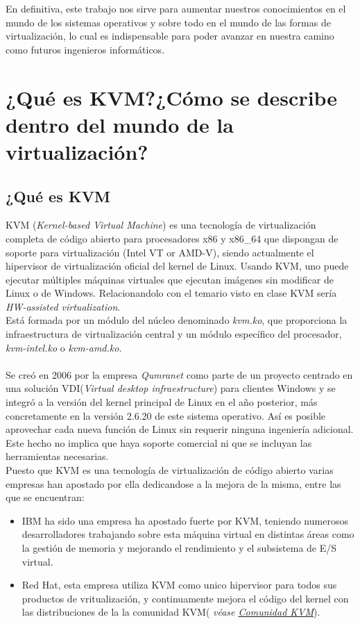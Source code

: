 \documentclass[11pt]{article}
\begin{document}
En definitiva, este trabajo nos sirve para aumentar nuestros conocimientos en el mundo de los sistemas operativos y sobre todo en el mundo de las formas de virtualización, lo cual es indispensable para poder avanzar en nuestra camino como futuros ingenieros informáticos.

\section{¿Qué es KVM?¿Cómo se describe dentro del mundo de la virtualización?}
\subsection{¿Qué es KVM}
KVM (\textit{Kernel-based Virtual Machine}) es una tecnología de virtualización completa de código abierto para procesadores x86 y x86\_64 que dispongan de soporte para virtualización (Intel VT or AMD-V), siendo actualmente el hipervisor de virtualización oficial del kernel de Linux. Usando KVM, uno puede ejecutar múltiples máquinas virtuales que ejecutan imágenes sin modificar de Linux o de Windows. Relacionandolo con el temario visto en clase KVM sería \textit{HW-assisted virtualization}.\\

Está formada por un módulo del núcleo denominado \textit{kvm.ko}, que proporciona la infraestructura de virtualización central y un módulo específico del procesador, \textit{kvm-intel.ko} o \textit{kvm-amd.ko}. \\
\\

Se creó en 2006 por la empresa \textit{Qumranet} como parte de un proyecto centrado en una solución VDI(\textit{Virtual desktop infraestructure}) para clientes Windows y se integró a la versión del kernel principal de Linux en el año posterior, más concretamente en la versión 2.6.20 de este sistema operativo. Así es posible aprovechar cada nueva función de Linux sin requerir ninguna ingeniería adicional. Este hecho no implica que haya soporte comercial ni que se incluyan las herramientas necesarias. \\

Puesto que KVM es una tecnología de virtualización de código abierto varias empresas han apostado por ella dedicandose a la mejora de la misma, entre las que se encuentran:

\begin{itemize}
\item IBM ha sido una empresa ha apostado fuerte por KVM, teniendo numerosos desarrolladores trabajando sobre esta máquina virtual en distintas áreas como la gestión de memoria y mejorando el rendimiento y el subsistema de E/S virtual. 
\item Red Hat, esta empresa utiliza KVM como unico hipervisor para todos sus productos de vritualización, y continuamente mejora el código del kernel con las distribuciones de la la comunidad KVM( \textit{véase \href{https://www.linux-kvm.org/page/Main_Page}{Comunidad KVM}}).
\end{itemize}
\end{document}
